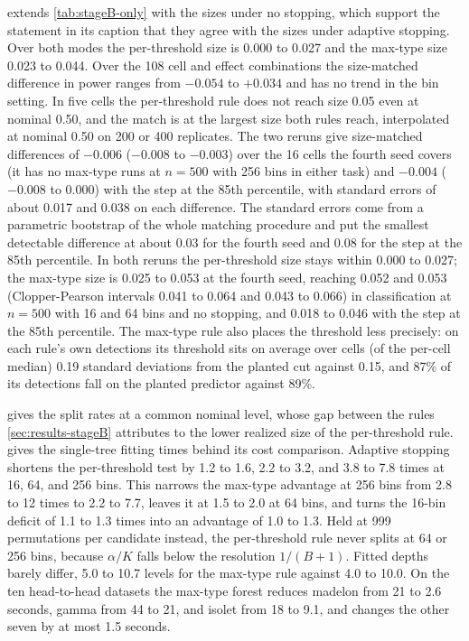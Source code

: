  extends \cref{tab:stageB-only} with the sizes under
no stopping, which support the statement in its caption that they agree with
the sizes under adaptive stopping. Over both modes the per-threshold size is
0.000 to 0.027 and the max-type size 0.023 to 0.044. Over the 108 cell and
effect combinations the size-matched difference in power ranges from $-0.054$
to $+0.034$ and has no trend in the bin setting. In five cells the
per-threshold rule does not reach size 0.05 even at nominal 0.50, and the match
is at the largest size both rules reach, interpolated at nominal 0.50 on 200
or 400 replicates. The two reruns give size-matched
differences of $-0.006$ ($-0.008$ to $-0.003$) over the 16 cells the fourth
seed covers (it has no max-type runs at $n=500$ with 256 bins in either task) and $-0.004$
($-0.008$ to $0.000$) with the step at the 85th percentile, with standard
errors of about 0.017 and 0.038 on each difference. The standard errors come
from a parametric bootstrap of the whole matching procedure and put the
smallest detectable difference at about 0.03 for the fourth seed and 0.08 for
the step at the 85th percentile. In both reruns the per-threshold size stays
within 0.000 to 0.027; the max-type size is 0.025 to 0.053 at the fourth seed,
reaching 0.052 and 0.053 (Clopper-Pearson intervals 0.041 to 0.064 and 0.043 to
0.066) in classification at $n=500$ with 16 and 64 bins and no stopping, and
0.018 to 0.046 with the step at the 85th percentile. The max-type rule also places the threshold less precisely: on each
rule's own detections its threshold sits on average over cells (of the per-cell
median) 0.19 standard deviations from the planted cut against 0.15, and 87\%
of its detections fall on the planted predictor against 89\%.

 gives the split rates at a common nominal level, whose
gap between the rules \cref{sec:results-stageB} attributes to the lower
realized size of the per-threshold rule.  gives the
single-tree fitting times behind its cost comparison. Adaptive stopping
shortens the per-threshold test by 1.2 to 1.6, 2.2 to 3.2, and 3.8 to 7.8
times at 16, 64, and 256 bins. This narrows the max-type advantage at 256 bins
from 2.8 to 12 times to 2.2 to 7.7, leaves it at 1.5 to 2.0 at 64 bins, and
turns the 16-bin deficit of 1.1 to 1.3 times into an advantage of 1.0 to 1.3. Held at 999 permutations per candidate
instead, the per-threshold rule never splits at 64 or 256 bins, because
$\alpha/K$ falls below the resolution $1/(B+1)$. Fitted depths barely differ,
5.0 to 10.7 levels for the max-type rule against 4.0 to 10.0. On the ten
head-to-head datasets the max-type forest reduces madelon from 21 to 2.6
seconds, gamma from 44 to 21, and isolet from 18 to 9.1, and changes the other
seven by at most 1.5 seconds.

